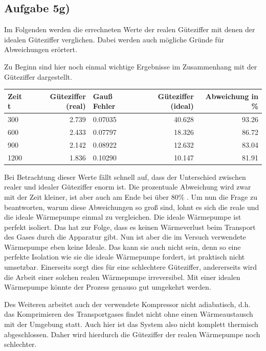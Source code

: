 \documentclass[titlepage=firstcover, captions=tableheading]{scrartcl}
\begin{document}
\subsection{Aufgabe 5g)}

Im Folgenden werden die errechneten Werte der realen Güteziffer mit denen der idealen Güteziffer verglichen.
Dabei werden auch mögliche Gründe für Abweichungen erörtert. 

\noindent Zu Beginn sind hier noch einmal wichtige Ergebnisse im Zusammenhang mit der Güteziffer dargestellt.
\begin{center}
    \begin{tabular}{lr@{${}\pm{}$}lrr}
        \toprule
        {Zeit t} & { Güteziffer (real)} & {Gauß Fehler} & {Güteziffer (ideal)} & {Abweichung in \%} \\
        \midrule
        300 & 2.739 & 0.07035  & 40.628 & 93.26 \\
        600 & 2.433 & 0.07797  & 18.326 & 86.72 \\
        900 & 2.142 & 0.08922 & 12.632 & 83.04 \\
        1200 & 1.836 & 0.10290 & 10.147 & 81.91\\
        \bottomrule
        
    \end{tabular}
\end{center}

\noindent Bei Betrachtung dieser Werte fällt schnell auf, dass der Unterschied zwischen realer und idealer Güteziffer enorm ist.
Die prozentuale Abweichung wird zwar mit der Zeit kleiner, ist aber auch am Ende bei über 80\% .
Um nun die Frage zu beantworten, warum diese Abweichungen so groß sind, lohnt es sich die reale und die ideale Wärmepumpe einmal zu vergleichen.
Die ideale Wärmepumpe ist perfekt isoliert. 
Das hat zur Folge, dass es keinen Wärmeverlust beim Transport des Gases durch die Apparatur gibt.
Nun ist aber die im Versuch verwendete Wärmepumpe eben keine Ideale. 
Das kann sie auch nicht sein, denn so eine perfekte Isolation wie sie die ideale Wärmepumpe fordert, ist praktisch nicht umsetzbar.
Einerseits sorgt dies für eine schlechtere Güteziffer, andererseits wird die Arbeit einer solchen realen Wärmepumpe irreversibel.
Mit einer idealen Wärmepumpe könnte der Prozess genauso gut umgekehrt werden.

\noindent Des Weiteren arbeitet auch der verwendete Kompressor nicht adiabatisch, 
d.h. das Komprimieren des Transportgases findet nicht ohne einen Wärmeaustausch mit der Umgebung statt.
Auch hier ist das System also nicht komplett thermisch abgeschlossen.
Daher wird hierdurch die Güteziffer der realen Wärmepumpe noch schlechter.
\end{document}
